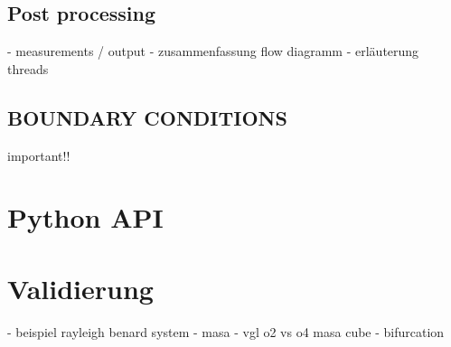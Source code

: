 \subsection{Post processing}
- measurements / output
- zusammenfassung flow diagramm
- erläuterung threads


\subsection{BOUNDARY CONDITIONS}
important!!

\section{Python API}

\section{Validierung}
- beispiel rayleigh benard system
- masa
- vgl o2 vs o4 masa cube
- bifurcation

\newpage

